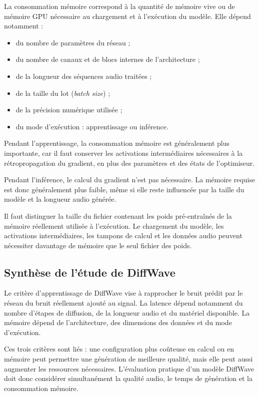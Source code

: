 La consommation mémoire correspond à la quantité de mémoire vive ou de mémoire GPU nécessaire au chargement et à l'exécution du modèle. Elle dépend notamment :
\begin{itemize}
    \item du nombre de paramètres du réseau ;
    \item du nombre de canaux et de blocs internes de l'architecture ;
    \item de la longueur des séquences audio traitées ;
    \item de la taille du lot (\textit{batch size}) ;
    \item de la précision numérique utilisée ;
    \item du mode d'exécution : apprentissage ou inférence.
\end{itemize}

Pendant l'apprentissage, la consommation mémoire est généralement plus importante, car il faut conserver les activations intermédiaires nécessaires à la rétropropagation du gradient, en plus des paramètres et des états de l'optimiseur.

Pendant l'inférence, le calcul du gradient n'est pas nécessaire. La mémoire requise est donc généralement plus faible, même si elle reste influencée par la taille du modèle et la longueur audio générée.

Il faut distinguer la taille du fichier contenant les poids pré-entraînés de la mémoire réellement utilisée à l'exécution. Le chargement du modèle, les activations intermédiaires, les tampons de calcul et les données audio peuvent nécessiter davantage de mémoire que le seul fichier des poids.

\subsection{Synthèse de l'étude de DiffWave}

Le critère d'apprentissage de DiffWave vise à rapprocher le bruit prédit par le réseau du bruit réellement ajouté au signal. La latence dépend notamment du nombre d'étapes de diffusion, de la longueur audio et du matériel disponible. La mémoire dépend de l'architecture, des dimensions des données et du mode d'exécution.

Ces trois critères sont liés : une configuration plus coûteuse en calcul ou en mémoire peut permettre une génération de meilleure qualité, mais elle peut aussi augmenter les ressources nécessaires. L'évaluation pratique d'un modèle DiffWave doit donc considérer simultanément la qualité audio, le temps de génération et la consommation mémoire.

